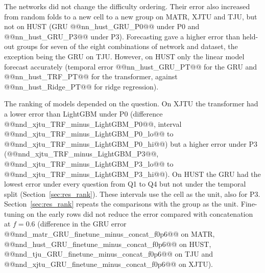 \documentclass{ieeeaccess}
\begin{document}
The networks did not change the difficulty ordering. Their error also increased from random folds to a new cell to a new group on MATR, XJTU and TJU, but not on HUST (GRU @@nn_hust_GRU_P0@@ under P0 and @@nn_hust_GRU_P3@@ under P3). Forecasting gave a higher error than held-out groups for seven of the eight combinations of network and dataset, the exception being the GRU on TJU. However, on HUST only the linear model forecast accurately (temporal error @@nn_hust_GRU_PT@@ for the GRU and @@nn_hust_TRF_PT@@ for the transformer, against @@nn_hust_Ridge_PT@@ for ridge regression).

The ranking of models depended on the question. On XJTU the transformer had a lower error than LightGBM under P0 (difference @@nnd_xjtu_TRF_minus_LightGBM_P0@@, interval @@nnd_xjtu_TRF_minus_LightGBM_P0_lo@@ to @@nnd_xjtu_TRF_minus_LightGBM_P0_hi@@) but a higher error under P3 (@@nnd_xjtu_TRF_minus_LightGBM_P3@@, @@nnd_xjtu_TRF_minus_LightGBM_P3_lo@@ to @@nnd_xjtu_TRF_minus_LightGBM_P3_hi@@). On HUST the GRU had the lowest error under every question from Q1 to Q4 but not under the temporal split (Section~\ref{sec:res_rank}). These intervals use the cell as the unit, also for P3. Section~\ref{sec:res_rank} repeats the comparisons with the group as the unit. Fine-tuning on the early rows did not reduce the error compared with concatenation at $f=0.6$ (difference in the GRU error @@nnd_matr_GRU_finetune_minus_concat_f0p6@@ on MATR, @@nnd_hust_GRU_finetune_minus_concat_f0p6@@ on HUST, @@nnd_tju_GRU_finetune_minus_concat_f0p6@@ on TJU and @@nnd_xjtu_GRU_finetune_minus_concat_f0p6@@ on XJTU).
\end{document}
